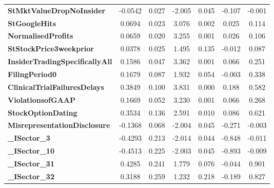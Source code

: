 \begin{table}[H]
\begin{center}
\begin{tabular}{lcccccc}
\textbf{StMktValueDropNoInsider}       &      -0.0542  &        0.027     &    -2.005  &         0.045        &       -0.107    &       -0.001     \\
\textbf{StGoogleHits}                  &       0.0694  &        0.023     &     3.076  &         0.002        &        0.025    &        0.114     \\
\textbf{NormalisedProfits}             &       0.0659  &        0.020     &     3.255  &         0.001        &        0.026    &        0.106     \\
\textbf{StStockPrice3weekprior}        &       0.0378  &        0.025     &     1.495  &         0.135        &       -0.012    &        0.087     \\
\textbf{InsiderTradingSpecificallyAll} &       0.1586  &        0.047     &     3.362  &         0.001        &        0.066    &        0.251     \\
\textbf{FilingPeriod0}                 &       0.1679  &        0.087     &     1.932  &         0.054        &       -0.003    &        0.338     \\
\textbf{ClinicalTrialFailuresDelays}   &       0.3849  &        0.100     &     3.831  &         0.000        &        0.188    &        0.582     \\
\textbf{ViolationsofGAAP}              &       0.1669  &        0.052     &     3.230  &         0.001        &        0.066    &        0.268     \\
\textbf{StockOptionDating}             &       0.3534  &        0.136     &     2.591  &         0.010        &        0.086    &        0.621     \\
\textbf{MisrepresentationDisclosure}   &      -0.1368  &        0.068     &    -2.004  &         0.045        &       -0.271    &       -0.003     \\
\textbf{\_ISector\_3}                  &      -0.4293  &        0.213     &    -2.014  &         0.044        &       -0.848    &       -0.011     \\
\textbf{\_ISector\_10}                 &      -0.4513  &        0.225     &    -2.003  &         0.045        &       -0.893    &       -0.009     \\
\textbf{\_ISector\_31}                 &       0.4285  &        0.241     &     1.779  &         0.076        &       -0.044    &        0.901     \\
\textbf{\_ISector\_32}                 &       0.3188  &        0.259     &     1.232  &         0.218        &       -0.189    &        0.827     \\

\end{tabular}
\end{center}
\end{table}
